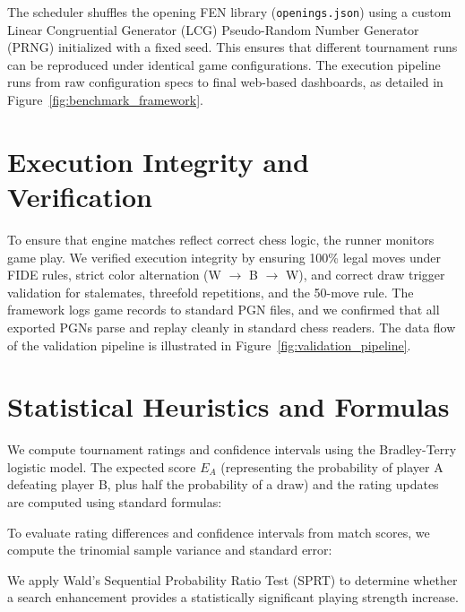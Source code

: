 

The scheduler shuffles the opening FEN library (\texttt{openings.json}) using a custom Linear Congruential Generator (LCG) Pseudo-Random Number Generator (PRNG) initialized with a fixed seed. This ensures that different tournament runs can be reproduced under identical game configurations. The execution pipeline runs from raw configuration specs to final web-based dashboards, as detailed in Figure~\ref{fig:benchmark_framework}.



\section{Execution Integrity and Verification}
To ensure that engine matches reflect correct chess logic, the runner monitors game play. We verified execution integrity by ensuring 100\% legal moves under FIDE rules, strict color alternation (W $\to$ B $\to$ W), and correct draw trigger validation for stalemates, threefold repetitions, and the 50-move rule. The framework logs game records to standard PGN files, and we confirmed that all exported PGNs parse and replay cleanly in standard chess readers. The data flow of the validation pipeline is illustrated in Figure~\ref{fig:validation_pipeline}.



\section{Statistical Heuristics and Formulas}
We compute tournament ratings and confidence intervals using the Bradley-Terry logistic model. The expected score $E_A$ (representing the probability of player A defeating player B, plus half the probability of a draw) and the rating updates are computed using standard formulas:



To evaluate rating differences and confidence intervals from match scores, we compute the trinomial sample variance and standard error:



We apply Wald's Sequential Probability Ratio Test (SPRT) to determine whether a search enhancement provides a statistically significant playing strength increase.

